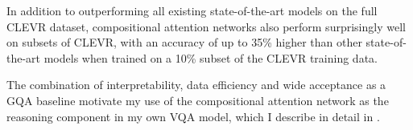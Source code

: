 In addition to outperforming all existing state-of-the-art models on the full CLEVR dataset, compositional attention networks also perform surprisingly well on subsets of CLEVR, with an accuracy of up to 35\% higher than other state-of-the-art models when trained on a 10\% subset of the CLEVR training data.

The combination of interpretability, data efficiency and wide acceptance as a GQA baseline motivate my use of the compositional attention network as the reasoning component in my own VQA model, which I describe in detail in \chapterautorefname{ \ref{chapter:methodology}}.





